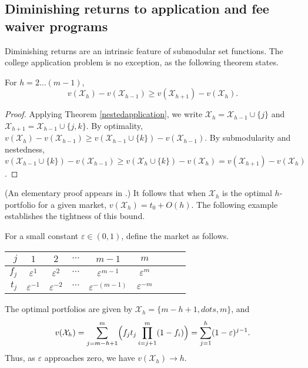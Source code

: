 \subsection{Diminishing returns to application and fee waiver programs}

Diminishing returns are an intrinsic feature of submodular set functions. The college application problem is no exception, as the following theorem states.

\begin{theorem} \label{concavityinh}
For $h = 2 \dots (m-1)$,
\begin{equation}v(\mathcal{X}_h) - v(\mathcal{X}_{h-1}) \geq v(\mathcal{X}_{h+1}) - v(\mathcal{X}_{h}).\end{equation} 
\end{theorem}

\begin{proof}
Applying Theorem \ref{nestedapplication}, we write $\mathcal{X}_h = \mathcal{X}_{h-1} \cup\{j\}$ and $\mathcal{X}_{h+1} = \mathcal{X}_{h-1} \cup\{j, k\}$. By optimality, $v(\mathcal{X}_h) - v(\mathcal{X}_{h-1}) \geq v(\mathcal{X}_{h-1}\cup\{k\}) - v(\mathcal{X}_{h-1})$. By submodularity and nestedness, $v(\mathcal{X}_{h-1}\cup\{k\}) - v(\mathcal{X}_{h-1}) \geq  v(\mathcal{X}_{h}\cup\{k\}) - v(\mathcal{X}_{h}) = v(\mathcal{X}_{h+1}) - v(\mathcal{X}_{h})$.
\end{proof}

\noindent (An elementary proof appears in \cite{kapur2022}.) It follows that when $\mathcal{X}_h$ is the optimal $h$-portfolio for a given market, $v(\mathcal{X}_h) = t_0 + O(h)$. The following example establishes the tightness of this bound.

\begin{example} \label{tightexampleforconcavity}
For a small constant $\varepsilon \in (0, 1)$, define the market as follows.
\begin{center}
\begin{tabular}{r|cccccccc}
$j$   & $1$ & $2$ & $\cdots$ & $m-1$ & $m$ \\ \hline
$f_j$ & $\varepsilon^{1}$ & $\varepsilon^{2}$ & $\cdots$ & $\varepsilon^{m-1}$ & $\varepsilon^{m}$ \\
$t_j$ & $\varepsilon^{-1}$ & $\varepsilon^{-2}$ & $\cdots$ & $\varepsilon^{-(m-1)}$ & $\varepsilon^{-m}$
\end{tabular}%
\end{center}
The optimal portfolios are given by $\mathcal{X}_h = \{m-h + 1, dots, m\}$, and 
\begin{equation*}
v(\mathcal{X}_h) = \sum_{j= m-h +1}^m \Bigl( f_j t_j \prod_{i = j+1}^m (1 - f_{i}) \Bigr) =  \sum_{j= 1}^h  (1 - \varepsilon)^{j-1}.
\end{equation*}
Thus, as $\varepsilon$ approaches zero, we have $v(\mathcal{X}_h) \to h$.
\end{example}

